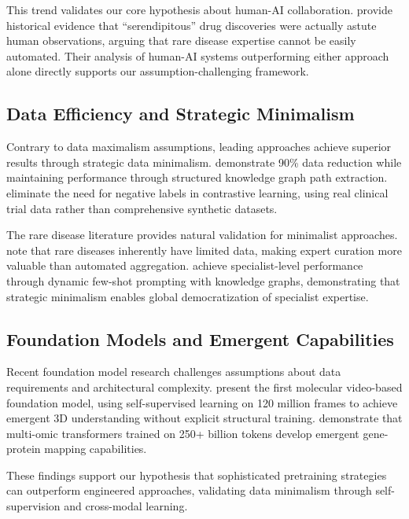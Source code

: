 \documentclass{article}
\begin{document}
This trend validates our core hypothesis about human-AI collaboration. \citet{challa_human_ai_2021} provide historical evidence that ``serendipitous'' drug discoveries were actually astute human observations, arguing that rare disease expertise cannot be easily automated. Their analysis of human-AI systems outperforming either approach alone directly supports our assumption-challenging framework.

\subsection{Data Efficiency and Strategic Minimalism}

Contrary to data maximalism assumptions, leading approaches achieve superior results through strategic data minimalism. \citet{kpaths_2025} demonstrate 90\% data reduction while maintaining performance through structured knowledge graph path extraction. \citet{drugclip_2024} eliminate the need for negative labels in contrastive learning, using real clinical trial data rather than comprehensive synthetic datasets.

The rare disease literature provides natural validation for minimalist approaches. \citet{cortial_rare_2024} note that rare diseases inherently have limited data, making expert curation more valuable than automated aggregation. \citet{rarebench_2024} achieve specialist-level performance through dynamic few-shot prompting with knowledge graphs, demonstrating that strategic minimalism enables global democratization of specialist expertise.

\subsection{Foundation Models and Emergent Capabilities}

Recent foundation model research challenges assumptions about data requirements and architectural complexity. \citet{videomol_2024} present the first molecular video-based foundation model, using self-supervised learning on 120 million frames to achieve emergent 3D understanding without explicit structural training. \citet{omnibioTE_2024} demonstrate that multi-omic transformers trained on 250+ billion tokens develop emergent gene-protein mapping capabilities.

These findings support our hypothesis that sophisticated pretraining strategies can outperform engineered approaches, validating data minimalism through self-supervision and cross-modal learning.
\end{document}
